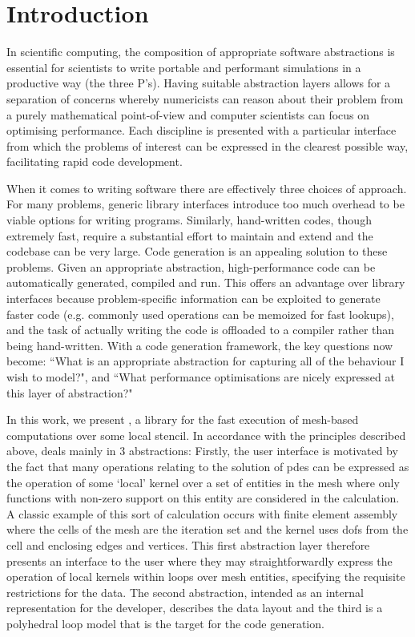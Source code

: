 \section{Introduction}

In scientific computing, the composition of appropriate software abstractions is essential for scientists to write portable and performant simulations in a productive way (the three P's).
Having suitable abstraction layers allows for a separation of concerns whereby numericists can reason about their problem from a purely mathematical point-of-view and computer scientists can focus on optimising performance.
Each discipline is presented with a particular interface from which the problems of interest can be expressed in the clearest possible way, facilitating rapid code development.

When it comes to writing software there are effectively three choices of approach.
For many problems, generic library interfaces introduce too much overhead to be viable options for writing programs.
Similarly, hand-written codes, though extremely fast, require a substantial effort to maintain and extend and the codebase can be very large.
Code generation is an appealing solution to these problems.
Given an appropriate abstraction, high-performance code can be automatically generated, compiled and run.
This offers an advantage over library interfaces because problem-specific information can be exploited to generate faster code (e.g. commonly used operations can be memoized for fast lookups), and the task of actually writing the code is offloaded to a compiler rather than being hand-written.
With a code generation framework, the key questions now become:
``What is an appropriate abstraction for capturing all of the behaviour I wish to model?", and
``What performance optimisations are nicely expressed at this layer of abstraction?"

In this work, we present , a library for the fast execution of mesh-based computations over some local stencil.
In accordance with the principles described above,  deals mainly in 3 abstractions:
Firstly, the user interface is motivated by the fact that many operations relating to the solution of \glspl{pde} can be expressed as the operation of some `local' kernel over a set of entities in the mesh where only functions with non-zero support on this entity are considered in the calculation.
A classic example of this sort of calculation occurs with finite element assembly where the cells of the mesh are the iteration set and the kernel uses \glspl{dof} from the cell and enclosing edges and vertices.
This first abstraction layer therefore presents an interface to the user where they may straightforwardly express the operation of local kernels within loops over mesh entities, specifying the requisite restrictions for the data.
The second abstraction, intended as an internal representation for the developer, describes the data layout and the third is a polyhedral loop model that is the target for the code generation.

